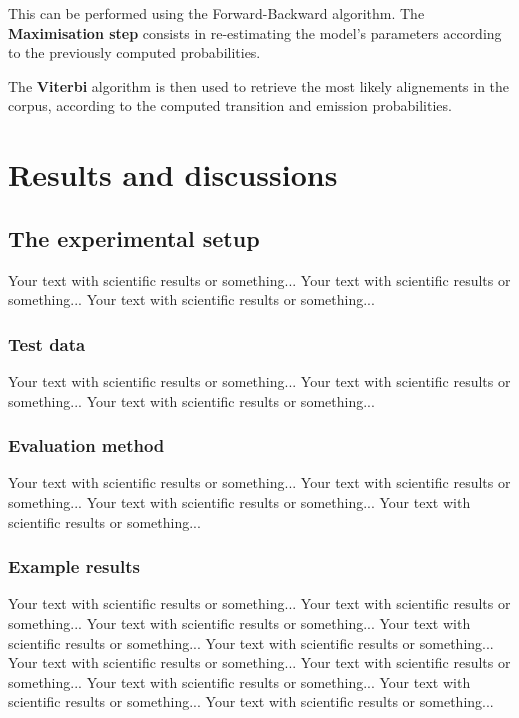\documentclass[final]{beamer}
\begin{document}
\begin{frame}[t]
\begin{multicols}{3}
This can be performed using the Forward-Backward algorithm.
The \textbf{Maximisation step} consists in re-estimating the model's parameters according to the previously computed probabilities.

The \textbf{Viterbi} algorithm is then used to retrieve the most likely alignements in the corpus, according to the computed transition and emission probabilities.

\section{Results and discussions}

\subsection{The experimental setup}

Your text with scientific results or something... 
Your text with scientific results or something... 
Your text with scientific results or something...

\subsubsection{Test data}
 
Your text with scientific results or something... 
Your text with scientific results or something... 
Your text with scientific results or something... 

\subsubsection{Evaluation method}
Your text with scientific results or something... 
Your text with scientific results or something... 
Your text with scientific results or something... 
Your text with scientific results or something... 



\subsubsection{Example results}
Your text with scientific results or something... 
Your text with scientific results or something... 
Your text with scientific results or something... 
Your text with scientific results or something... 
Your text with scientific results or something... 
Your text with scientific results or something... 
Your text with scientific results or something... 
Your text with scientific results or something... 
Your text with scientific results or something... 
Your text with scientific results or something... 


\end{multicols}
\end{frame}
\end{document}
